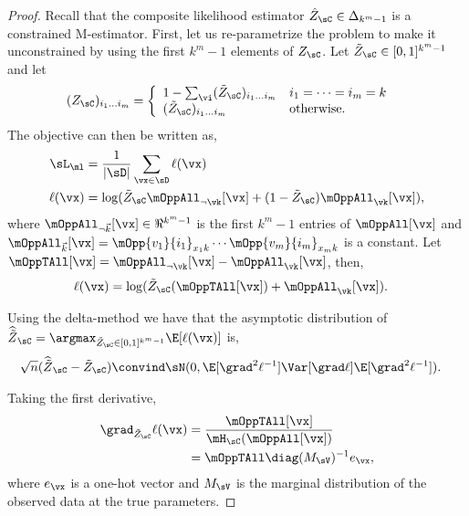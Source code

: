 \begin{proof}
  Recall that the composite likelihood estimator $\hat Z_\sC
  \in \Delta_{k^m-1}$ is a constrained M-estimator.
  First, let us re-parametrize the problem to make it unconstrained by
  using the first $k^m - 1$ elements of $Z_\sC$.  
  Let $\tilde Z_\sC \in [0,1]^{k^m-1}$ and let 
  \begin{align*}
    (Z_\sC)_{i_1 \ldots i_m} &= \left\{
      \begin{array}{ll}
        1 - \sum_{\vi} (\tilde Z_\sC)_{i_1 \ldots i_m} & i_1 = \cdots = i_m = k \\
        (\tilde Z_\sC)_{i_1 \ldots i_m} & \text{otherwise.}
        \end{array}
        \right.
  \end{align*}
  The objective can then be written as,
  \begin{align*}
    \sL_\ml &= \frac{1}{|\sD|} \sum_{\vx \in \sD} \ell(\vx) \\
    \ell(\vx) &= \log(\tilde Z_\sC \mOppAll_{\neg \vk}[\vx] + (1 - \tilde Z_\sC) \mOppAll_{\vk}[\vx]),
  \end{align*}
  where $\mOppAll_{\neg \vec k}[\vx] \in \Re^{k^m-1}$ is the first $k^m-1$
    entries of $\mOppAll[\vx]$ and
  $\mOppAll_{\vec k}[\vx] = \mOpp{v_1}{i_1}_{x_1k} \cdots
    \mOpp{v_m}{i_m}_{x_mk}$ is a constant. 
Let $\mOppTAll[\vx] = \mOppAll_{\neg \vk}[\vx] - \mOppAll_{\vk}[\vx]$, then,
  \begin{align*}
    \ell(\vx) &= \log(\tilde Z_\sC(\mOppTAll[\vx]) + \mOppAll_{\vk}[\vx]).
  \end{align*}

Using the delta-method \cite{vaart98asymptotic} we have that the asymptotic distribution of 
  $\widehat{{\tilde Z}}_\sC = \argmax_{\tilde Z_\sC \in [0,1]^{k^m-1}} \E[\ell(\vx)]$ is,
  \begin{align*}
    \sqrt{n}(\widehat{\tilde{Z}}_{\sC} - \tilde{Z}_{\sC}) 
      &\convind \sN( 0, \E[\grad^2 \ell^{-1}] \Var[\grad \ell] \E[\grad^2 \ell^{-1}]).
  \end{align*}

Taking the first derivative,
\begin{align}
  \grad_{\tilde Z_\sC} \ell(\vx)
  &= \frac{\mOppTAll[\vx]}{\mH_\sC(\mOppAll[\vx]) } \nonumber \\ 
  &= \mOppTAll \diag(M_{\sV})^{-1} e_\vx, \label{eqn:lhood-grad}
\end{align}
where $e_\vx$ is a one-hot vector and $M_\sV$ is the marginal
distribution of the observed data at the true parameters.


\end{proof}
